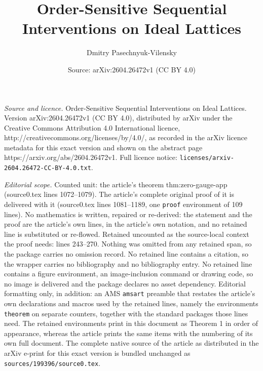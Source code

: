 \documentclass[10pt,a4paper]{amsart}
\title{Order-Sensitive Sequential Interventions on Ideal Lattices}
\author{Dmitry Pasechnyuk-Vilensky}
\date{Source: arXiv:2604.26472v1 (CC BY 4.0)}
\begin{document}
\maketitle

\noindent\emph{Source and licence.} Order-Sensitive Sequential Interventions on Ideal Lattices. Version arXiv:2604.26472v1 (CC BY 4.0), distributed by arXiv under the Creative Commons Attribution 4.0 International licence, http://creativecommons.org/licenses/by/4.0/, as recorded in the arXiv licence metadata for this exact version and shown on the abstract page https://arxiv.org/abs/2604.26472v1. Full licence notice: \texttt{licenses/arxiv-2604.26472-CC-BY-4.0.txt}.\par\smallskip

\noindent\textit{Editorial scope.} Counted unit: the article's theorem thm:zero-gauge-app (source0.tex lines 1072--1079). The article's complete original proof of it is delivered with it (source0.tex lines 1081--1189, one \texttt{proof} environment of 109 lines). No mathematics is written, repaired or re-derived: the statement and the proof are the article's own lines, in the article's own notation, and no retained line is substituted or re-flowed.  Retained uncounted as the source-local context the proof needs: lines 243--270.  Nothing was omitted from any retained span, so the package carries no omission record.  No retained line contains a citation, so the wrapper carries no bibliography and no bibliography entry.  No retained line contains a figure environment, an image-inclusion command or drawing code, so no image is delivered and the package declares no asset dependency.  Editorial formatting only, in addition: an AMS \texttt{amsart} preamble that restates the article's own declarations and macros used by the retained lines, namely the environments \texttt{theorem} on separate counters, together with the standard packages those lines need.  The retained environments print in this document as Theorem 1 in order of appearance, whereas the article prints the same items with the numbering of its own full document.  The complete native source of the article as distributed in the arXiv e-print for this exact version is bundled unchanged as \texttt{sources/199396/source0.tex}.
\end{document}

